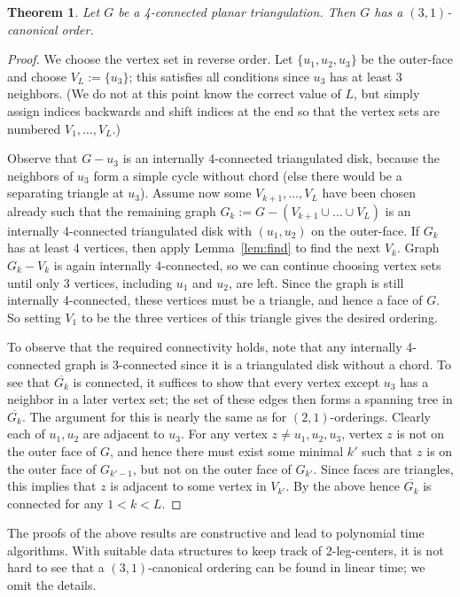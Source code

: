 \documentclass[12pt]{article}
\newtheorem{theorem}{Theorem}
\begin{document}
\begin{theorem}
Let $G$ be a 4-connected planar triangulation. 
Then $G$ has a $(3,1)$-canonical order.
\end{theorem}
\begin{proof}
We choose the vertex set in reverse order.    Let $\{u_1,u_2,u_3\}$ be
the outer-face and choose $V_L:=\{u_3\}$; this satisfies all conditions
since $u_3$ has at least 3 neighbors.  (We do not at this point know the
correct value of $L$, but simply assign indices backwards and shift
indices at the end so that the vertex sets are numbered $V_1,\dots,V_L$.)

Observe that $G-u_3$
is an internally 4-connected triangulated disk, because the neighbors
of $u_3$ form a simple cycle without chord (else there would be a separating
triangle at $u_3$).
Assume now some $V_{k+1},\dots,V_L$ have been chosen already such that
the remaining graph $G_k:=G-(V_{k+1}\cup \dots \cup V_L)$ is an
internally 4-connected triangulated disk with $(u_1,u_2)$ on the outer-face.
If $G_k$ has at least 4 vertices, then apply Lemma~\ref{lem:find} to find the next 
$V_k$.  
Graph $G_k-V_k$ is again internally 4-connected, so 
we can continue choosing vertex sets until only 3 vertices, including
$u_1$ and $u_2$, are left.
Since the graph is still internally 4-connected, these vertices must
be a triangle, and hence a face of $G$.  So setting $V_1$ to be the
three vertices of this triangle gives the desired ordering.

To observe that the required connectivity holds, note that any
internally 4-connected graph is 3-connected since it is a
triangulated disk without a chord.  To see that $\overline{G_k}$
is connected, it suffices to show that every vertex except $u_3$
has a neighbor in a later vertex set; the set of these edges
then forms a spanning tree in $\overline{G_k}$.  The argument for
this is nearly the same as for $(2,1)$-orderings.  Clearly 
each of $u_1,u_2$ are adjacent to $u_3$.  For any vertex $z\neq u_1,u_2,u_3$,
vertex $z$ is not on the outer face of $G$, and hence there must
exist some minimal $k'$ such that $z$ is on the outer face of
$G_{k'-1}$, but not on the outer face of $G_{k'}$.  Since faces
are triangles, this implies that $z$ is adjacent to some vertex
in $V_{k'}$.  By the above hence $\overline{G_k}$ is connected for
any $1<k<L$.
\end{proof}


The proofs of the above results are constructive and lead
to polynomial time algorithms.  With suitable data structures
to keep track of 2-leg-centers, it is not hard to see that 
a $(3,1)$-canonical ordering can be found in linear time; we
omit the details.
\end{document}
